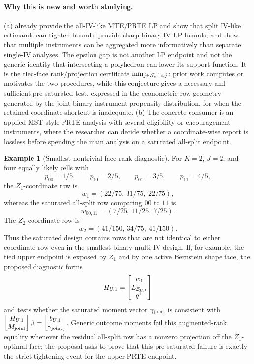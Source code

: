 \documentclass[11pt]{article}
\newcommand{\transpose}{\mathsf{T}}
\theoremstyle{definition}
\newtheorem{example}{Example}
\theoremstyle{plain}
\theoremstyle{remark}
\begin{document}
\paragraph{Why this is new and worth studying.}
(a) \citet{MogstadSantosTorgovitsky2018} already provide the all-IV-like
MTE/PRTE LP and show that split IV-like estimands can tighten bounds;
\citet{HanYang2024} provide sharp binary-IV LP bounds; and
\citet{MogstadTorgovitskyWalters2024} show that multiple instruments can be
aggregated more informatively than separate single-IV analyses.  The epsilon
gap is not another LP endpoint and not the generic identity that intersecting
a polyhedron can lower its support function.  It is the tied-face
rank/projection certificate \(\min_{j\in{\cal J}_e}\tau_{e,j}\): prior work
computes or motivates the two procedures, while this conjecture gives a
necessary-and-sufficient pre-saturated test, expressed in the econometric row
geometry generated by the joint binary-instrument propensity distribution, for
when the retained-coordinate shortcut is inadequate.  (b) The concrete
consumer is an applied MST-style PRTE analysis with several eligibility or
encouragement instruments, where the researcher can decide whether a
coordinate-wise report is lossless before spending the main analysis on a
saturated all-split endpoint.

\begin{example}[Smallest nontrivial face-rank diagnostic]\label{ex:k2j2}
For \(K=2\), \(J=2\), and four equally likely cells with
\[
p_{00}=1/5,\qquad p_{10}=2/5,\qquad p_{01}=3/5,\qquad p_{11}=4/5,
\]
the \(Z_1\)-coordinate row is
\[
w_1=(22/75,\ 31/75,\ 22/75),
\]
whereas the saturated all-split row comparing \(00\) to \(11\) is
\[
w_{00,11}=(7/25,\ 11/25,\ 7/25).
\]
The \(Z_2\)-coordinate row is
\[
w_2=(41/150,\ 34/75,\ 41/150).
\]
Thus the saturated design contains rows that are not identical to either
coordinate row even in the smallest binary multi-IV design.  If, for example,
the tied upper endpoint is exposed by \(Z_1\) and by one active Bernstein
shape face, the proposed diagnostic forms
\[
H_{U,1}=\begin{bmatrix}w_1\\ L_{{\cal B}_{U,1}}\\ q^\transpose\end{bmatrix}
\]
and tests whether the saturated moment vector
\(\gamma_{\rm joint}\) is consistent with
\(\begin{bmatrix}H_{U,1}\\ M_{\rm joint}\end{bmatrix}\beta
=\begin{bmatrix}b_{U,1}\\ \gamma_{\rm joint}\end{bmatrix}\).  Generic
outcome moments fail this augmented-rank equality whenever the residual
all-split row has a nonzero projection off the \(Z_1\)-optimal face; the
proposal asks to prove that this pre-saturated failure is exactly the
strict-tightening event for the upper PRTE endpoint.
\end{example}
\end{document}
